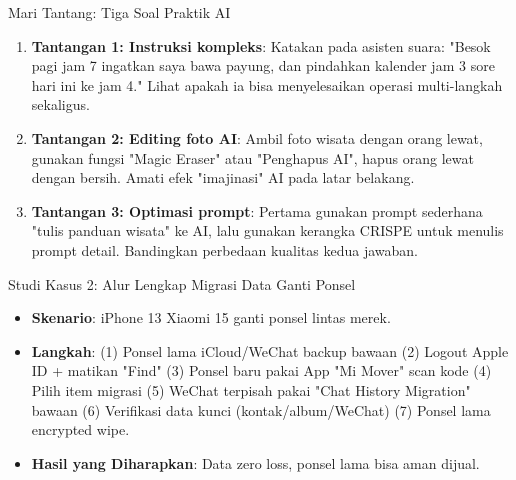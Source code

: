 \begin{tcbpractice}{Mari Tantang: Tiga Soal Praktik AI}
\begin{enumerate}
  \item \textbf{Tantangan 1: Instruksi kompleks}: Katakan pada asisten suara: "Besok pagi jam 7 ingatkan saya bawa payung, dan pindahkan kalender jam 3 sore hari ini ke jam 4." Lihat apakah ia bisa menyelesaikan operasi multi-langkah sekaligus.
  \item \textbf{Tantangan 2: Editing foto AI}: Ambil foto wisata dengan orang lewat, gunakan fungsi "Magic Eraser" atau "Penghapus AI", hapus orang lewat dengan bersih. Amati efek "imajinasi" AI pada latar belakang.
  \item \textbf{Tantangan 3: Optimasi prompt}: Pertama gunakan prompt sederhana "tulis panduan wisata" ke AI, lalu gunakan kerangka CRISPE untuk menulis prompt detail. Bandingkan perbedaan kualitas kedua jawaban.
\end{enumerate}

\end{tcbpractice}

\begin{tcbinfo}{Studi Kasus 2: Alur Lengkap Migrasi Data Ganti Ponsel}
\begin{itemize}
  \item \textbf{Skenario}: iPhone 13 Xiaomi 15 ganti ponsel lintas merek.
  \item \textbf{Langkah}: (1) Ponsel lama iCloud/WeChat backup bawaan (2) Logout Apple ID + matikan "Find" (3) Ponsel baru pakai App "Mi Mover" scan kode (4) Pilih item migrasi (5) WeChat terpisah pakai "Chat History Migration" bawaan (6) Verifikasi data kunci (kontak/album/WeChat) (7) Ponsel lama encrypted wipe.
  \item \textbf{Hasil yang Diharapkan}: Data zero loss, ponsel lama bisa aman dijual.
\end{itemize}

\end{tcbinfo}
